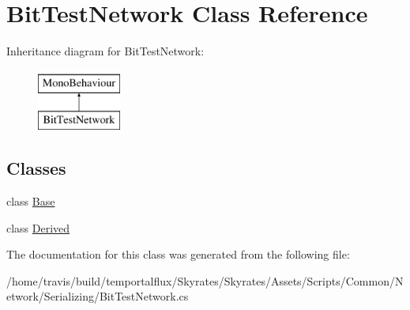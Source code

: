 \hypertarget{class_bit_test_network}{\section{Bit\-Test\-Network Class Reference}
\label{class_bit_test_network}
}
Inheritance diagram for Bit\-Test\-Network\-:\begin{figure}[H]
\begin{center}
\leavevmode
\includegraphics[height=2.000000cm]{class_bit_test_network}
\end{center}
\end{figure}
\subsection*{Classes}
\begin{DoxyCompactItemize}
\item 
class \hyperlink{class_bit_test_network_1_1_base}{Base}
\item 
class \hyperlink{class_bit_test_network_1_1_derived}{Derived}
\end{DoxyCompactItemize}


The documentation for this class was generated from the following file\-:\begin{DoxyCompactItemize}
\item 
/home/travis/build/temportalflux/\-Skyrates/\-Skyrates/\-Assets/\-Scripts/\-Common/\-Network/\-Serializing/Bit\-Test\-Network.\-cs\end{DoxyCompactItemize}
